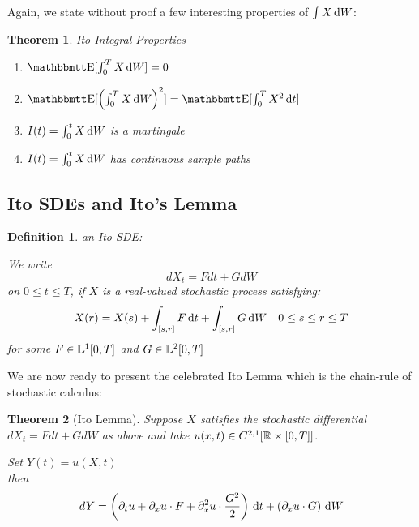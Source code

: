 \documentclass{article}
\newtheorem{thm}{Theorem}[section]
\newtheorem{defn}{Definition}[thm]
\begin{document}
Again, we state without proof a few interesting properties of $\int X \, \mathrm{d} W$:
\begin{thm} Ito Integral Properties

\begin{enumerate}
  \item $\Exp[\int_0^T X \intd{W} ] = 0$ 
  \item $\Exp[\left(\int_0^T X \intd{W}\right)^2 ] = \Exp[\int_0^T X^2
  \intd{t}]$
  \item $I(t) = \int_0^t X \, \mathrm{d} W $ is a martingale 
  \item $I(t) = \int_0^t X \, \mathrm{d} W $ has continuous sample paths
\end{enumerate}
\end{thm}

\subsection{Ito SDEs and Ito's Lemma}
\begin{defn} an Ito SDE:

We write
\begin{equation}
dX_t = Fdt + G dW
\end{equation}
on $0 \leq t \leq T$, if $X$ is a real-valued stochastic process satisfying:
\begin{equation*}
X(r) = X(s) + \int_{[s,r]} F \, \mathrm{d} t + \int_{[s,r]} G \, \mathrm{d} W
\quad 0\leq s \leq r \leq T
\end{equation*}
for some $F \in {\mathbb{L}^1}[0,T]$ and $G \in {\mathbb{L}^2}[0,T]$
\end{defn}

We are now ready to present the celebrated Ito Lemma which is the chain-rule of
stochastic calculus:

\begin{thm}[Ito Lemma] Suppose $X$ satisfies the stochastic differential $dX_t =
Fdt + G dW$ as above and take $u(x,t) \in C^{2,1}[ { \mathbb{R} } \times [0,T]]$.

Set $Y(t) = u(X,t)$
\\
then
$$
dY =  \left( {\partial}_t u + {\partial}_x u \cdot F + {\partial}^2_x u \cdot \frac{G^2}2 \right)
\, \mathrm{d} t + \left(   {\partial}_x u\cdot G  \right)\, \mathrm{d} W
$$
\end{thm}
\end{document}
